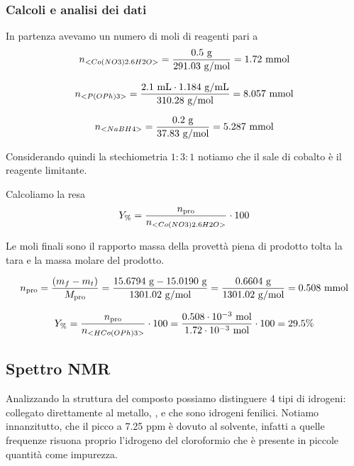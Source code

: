 \subsubsection{Calcoli e analisi dei dati}



In partenza avevamo un numero di moli di reagenti pari a
\[ n_{<Co(NO3)2.6H2O>}=\frac{0.5 \mathrm{~g}}{291.03 \mathrm{~g} / \mathrm{mol}}= 1.72 \mathrm{~mmol} \]

\[ n_{<P(OPh)3>}=\frac{2.1 \mathrm{~mL} \cdot 1.184 \mathrm{~g} / \mathrm{mL} }{310.28 \mathrm{~g} / \mathrm{mol}}= 8.057 \mathrm{~mmol} \]

\[ n_{<NaBH4>}=\frac{0.2 \mathrm{~g}  }{37.83 \mathrm{~g} / \mathrm{mol}}= 5.287 \mathrm{~mmol} \]

Considerando quindi la stechiometria $1: 3: 1$ notiamo che il sale di cobalto è il reagente limitante. 



Calcoliamo la resa 
\[ Y_\% = \frac{n_\text{pro}}{n_{<Co(NO3)2.6H2O>}}\cdot 100 \]

Le moli finali sono il rapporto massa della provettà piena di prodotto tolta la tara e la massa molare del prodotto.

\[ n_\text{pro} = \frac{(m_{f} - m_{t})}{M_\text{pro}} 
 = \frac{ 15.6794 \mathrm{\ g} - 15.0190 \mathrm{\ g} }{ 1301.02 \mathrm{\ g/mol}} =  \frac{0.6604 \mathrm{~g}}{1301.02 \mathrm{~g} / \mathrm{mol}}=0.508 \mathrm{\ mmol}\]

\[ Y_\% = \frac{n_\text{pro}}{n_{<HCo(OPh)3>}}\cdot 100  = \frac{  0.508 \cdot 10^{-3} \mathrm{~mol}}{1.72 \cdot 10^{-3} \mathrm{~mol}} \cdot 100 =29.5\%\]

\subsection{Spettro NMR}
Analizzando la struttura del composto possiamo distinguere 4 tipi di idrogeni:  collegato direttamente al metallo, ,  e  che sono idrogeni fenilici. Notiamo innanzitutto, che il picco a 7.25 ppm è dovuto al solvente, infatti a quelle frequenze risuona proprio l'idrogeno del cloroformio che è presente in piccole quantità come impurezza.  

